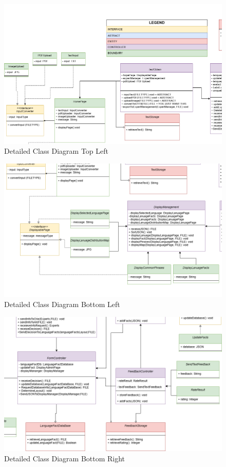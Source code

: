 \begin{figure}[H]
	\centering
	\includegraphics[width=\textwidth, height=\textheight, keepaspectratio]{Section4/images/LangufiyClassDiagramV6TL.png}
	\caption{Detailed Class Diagram Top Left}
	\label{DetailedClassDiagramQ2}
\end{figure}

\begin{figure}[H]
	\centering
	\includegraphics[width=\textwidth, height=\textheight, keepaspectratio]{Section4/images/LangufiyClassDiagramV6BL.png}
	\caption{Detailed Class Diagram Bottom Left}
	\label{DetailedClassDiagramQ3}
\end{figure}

\begin{figure}[H]
	\centering
	\includegraphics[width=\textwidth, height=\textheight, keepaspectratio]{Section4/images/LangufiyClassDiagramV6BR.png}
	\caption{Detailed Class Diagram Bottom Right}
	\label{DetailedClassDiagramQ4}
\end{figure}